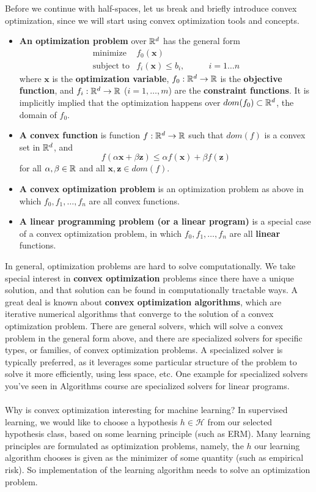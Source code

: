 \documentclass[11pt]{article}
\newcommand{\Hc}{\mathcal{H}}
\newcommand{\VV}[1]{\mathbf{#1}}
\begin{document}
Before we continue with half-spaces, let us break and briefly introduce convex
optimization, since we will start using convex optimization tools and concepts.

\begin{itemize}
  \item {\bf An optimization problem} over $\mathbb{R}^d$ has the general form
    \begin{eqnarray*}
      \text{minimize} & f_0(\VV{x}) & \\
      \text{subject to} & f_i(\VV{x}) \leq b_i, & \qquad i=1\ldots n
    \end{eqnarray*}
    where $\VV{x}$ is the {\bf optimization variable}, $f_0:\mathbb{R}^d\to\mathbb{R}$ is
    the {\bf objective function},  and  $f_i:\mathbb{R}^d\to\mathbb{R}$ ($i=1,\ldots,m$) are
    the {\bf constraint functions}. It is implicitly implied that 
    the optimization happens over $dom(f_0)\subset
    \mathbb{R}^d$, the domain of $f_0$.
  \item {\bf A convex function} is
    function $f:\mathbb{R}^d\to\mathbb{R}$ such that $dom(f)$ is a
    convex set in $\mathbb{R}^d$, and 
    \[
      f(\alpha \VV{x} + \beta \VV{z}) \leq  \alpha f(\VV{x}) + \beta f(\VV{z})
    \]
    for all $\alpha,\beta\in\mathbb{R}$ and all $\VV{x},\VV{z}\in dom(f)$.

  \item {\bf A convex  optimization problem} is an optimization problem as above
    in which $f_0,f_1,\ldots, f_n$ are all convex functions.
  \item {\bf A linear programming problem (or a linear program)} 
    is a special case of a convex optimization problem, in which 
    $f_0,f_1,\ldots, f_n$ are all {\bf linear} functions.

\end{itemize}


In general, optimization problems are hard to solve computationally. We take
special interest in {\bf convex optimization} problems since there have a unique
solution, and that solution can be found in  computationally tractable ways. A
great deal is known about {\bf convex optimization algorithms}, which are
iterative numerical algorithms that converge to the solution of a convex
optimization problem. There are general solvers, which will solve a convex
problem in the general form above, and there are specialized solvers for specific
types, or families, of convex optimization problems. A specialized solver is
typically preferred, as it leverages some particular structure of the problem to
solve it more efficiently, using less space, etc. One example for specialized
solvers you've seen in Algorithms course are specialized solvers for linear
programs.
\\~\\
Why is convex optimization interesting for machine learning? In supervised
learning, we would like to choose a hypothesis $h\in\Hc$ from our selected
hypothesis class, based on some learning principle (such as ERM). Many learning
principles are formulated as optimization problems, namely, the $h$ our learning
algorithm chooses is
given as the minimizer of some quantity (such as empirical risk). So
implementation of the
learning algorithm needs to solve an optimization problem. 
\end{document}
